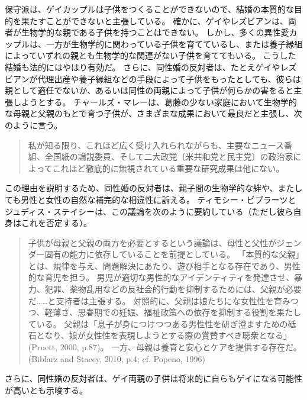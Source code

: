 \documentclass[paper=a4,book,openany]{jlreq} \usepackage{mystyle}
\begin{document}
保守派は、ゲイカップルは子供をつくることができないので、結婚の本質的な目的を果たすことができないと主張している。
確かに、ゲイやレズビアンは、両者が生物学的な親である子供を持つことはできない。
しかし、多くの異性愛カップルは、一方が生物学的に関わっている子供を育てているし、または養子縁組によっていずれの親とも生物学的な関連がない子供を育ててもいる。
こうした結婚も法的にはやはり有効だ。
さらに、同性婚の反対者は、たとえゲイやレズビアンが代理出産や養子縁組などの手段によって子供をもったとしても、彼らは親として適任でないか、あるいは同性の両親によって子供が何らかの害をると主張しようとする。
チャールズ・マレーは、葛藤の少ない家庭において生物学的な母親と父親のもとで育つ子供が、さまざまな成果において最良だと主張し、次のように言う。

\begin{quote}
私が知る限り、これほど広く受け入れられながらも、主要なニュース番組、全国紙の論説委員、そして二大政党〔米共和党と民主党〕の政治家によってこれほど徹底的に無視されている重要な研究成果は他にない。
\citep[p.162]{murray12:_comin_apart}
\end{quote}

この理由を説明するため、同性婚の反対者は、親子間の生物学的な絆や、またしても男性と女性の自然な補完的な相違性に訴える。
ティモシー・ビブラーツとジュディス・ステイシーは、この議論を次のように要約している（ただし彼ら自身はこれを否定する）。

\begin{quote}
子供が母親と父親の両方を必要とするという議論は、母性と父性がジェンダー固有の能力に依存していることを前提としている。
「本質的な父親」とは、規律を与え、問題解決にあたり、遊び相手となる存在であり、男性的な育児を担う。
男児が適切な男性的なアイデンティティを発達させ、暴力、犯罪、薬物乱用などの反社会的行動を抑制するためには、父親が必要だ……と支持者は主張する。
対照的に、父親は娘たちにな女性性を育みつつ、軽薄さ、思春期での妊娠、福祉政策への依存を抑制する役割を果たしている。
父親は「息子が身につけつつある男性性を研ぎ澄ますための砥石となり、娘が女性性を表現しようとする際の賞賛すべき聴衆となる」(Pruett, 2000, p.87)。
一方、母親は養育と安心とケアを提供する存在だ。
(Biblarz and Stacey, 2010, p.4; cf. Popeno, 1996)
\nocite{biblarz10:_how_does_gender_paren_matter}\nocite{pruett00:_father}\nocite{popenoe96:_life_father}

\end{quote}

さらに、同性婚の反対者は、ゲイ両親の子供は将来的に自らもゲイになる可能性が高いとも示唆する。
\end{document}
